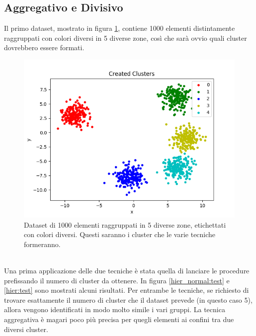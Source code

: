 \documentclass{llncs}
\begin{document}
	\subsection{Aggregativo e Divisivo}
	Il primo dataset, mostrato in figura \ref{c:5_c}, contiene 1000 elementi distintamente raggruppati con colori diversi in 5 diverse zone, così che sarà ovvio quali cluster dovrebbero essere formati.
	\begin{figure}[h]
		\centering
		\includegraphics[scale=.35]{immagini/5_clusters.png}
		\caption{Dataset di 1000 elementi raggruppati in 5 diverse zone, etichettati con colori diversi. Questi saranno i cluster che le varie tecniche formeranno.}
		\label{c:5_c}
	\end{figure}\\
	Una prima applicazione delle due tecniche è stata quella di lanciare le procedure prefissando il numero di cluster da ottenere. 
	In figura \ref{hier_normal:test} e \ref{hier:test} sono mostrati alcuni risultati.
	Per entrambe le tecniche, se richiesto di trovare esattamente il numero di cluster che il dataset prevede (in questo caso 5),
	allora vengono identificati in modo molto simile i vari gruppi. La tecnica aggregativa è magari poco più precisa per quegli elementi ai confini tra due diversi cluster. 
\end{document}
